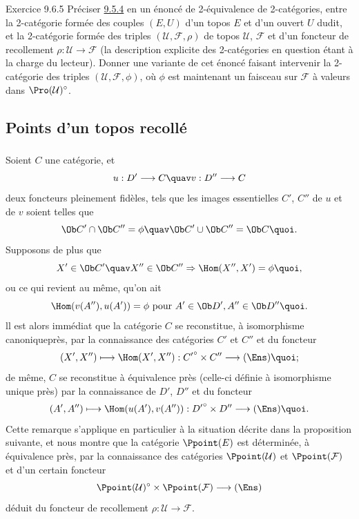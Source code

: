 \begin{enonce*}[remark]{Exercice 9.6.5}
Préciser \hyperref[IV.theo9.5.4]{9.5.4} en un énoncé de 2-équivalence de
2-catégories, entre la 2-catégorie formée des couples $(E,U)$ d'un
topos $E$ et d'un ouvert $U$ dudit, et la 2-catégorie formée des
triples $(\mathcal{U},\mathcal{F},\rho)$ de topos $\mathcal{U}$,
$\mathcal{F}$ et d'un foncteur de recollement
$\rho:\mathcal{U}\rightarrow \mathcal{F}$ (la description explicite
des 2-catégories en question étant à la charge du lecteur). Donner
une variante de cet énoncé faisant intervenir la 2-catégorie des
triples $(\mathcal{U},\mathcal{F}, \phi)$, où $\phi$ est maintenant
un faisceau sur $\mathcal{F}$ à valeurs dans
$\Pro(\mathcal{U})^{\circ}$.
\end{enonce*}

\subsection{Points d'un topos recollé}

\subsubsection{}
Soient $C$ une catégorie, et
$$
u:D'\longrightarrow C\quav v:D''\longrightarrow C
$$
deux foncteurs pleinement fidèles, tels que les images essentielles
$C'$, $C''$ de $u$ et de $v$ soient telles que
$$
\Ob C'\cap \Ob C''=\phi\quav \Ob C'\cup \Ob C''=\Ob C{\quoi}.
$$
Supposons de plus que
$$
X'\in \Ob C'\quav X''\in \Ob C''\Rightarrow
\Hom(X'',X')=\phi{\quoi},
$$
ou ce qui revient au même, qu'on ait
$$
\Hom(v(A''), u(A'))=\phi\mbox{ pour } A'\in \Ob D', A''\in \Ob
D''{\quoi}.
$$
ll est alors immédiat que la catégorie $C$ se reconstitue, à
isomorphisme canonique\pageoriginale près, par la connaissance des
catégories $C'$ et $C''$ et du foncteur
$$
(X',X'')\longmapsto \Hom(X',X''):{C'}^{\circ}\times
C''\longrightarrow (\Ens){\quoi};
$$
de même, $C$ se reconstitue à équivalence près (celle-ci définie à
isomorphisme unique près) par la connaissance de $D'$, $D''$ et du
foncteur
$$
(A',A'')\longmapsto \Hom(u(A'), v(A'')):{D'}^{\circ}\times
D''\longrightarrow (\Ens){\quoi}.
$$
Cette remarque s'applique en particulier à la situation décrite dans
la proposition suivante, et nous montre que la catégorie
$\Ppoint(E)$ est déterminée, à équivalence près, par la connaissance
des catégories $\Ppoint(\mathcal{U})$ et $\Ppoint(\mathcal{F})$ et
d'un certain foncteur
$$
\Ppoint(\mathcal{U})^{\circ}\times
\Ppoint(\mathcal{F})\longrightarrow (\Ens)
$$
déduit du foncteur de recollement $\rho:\mathcal{U}\rightarrow
\mathcal{F}$.

